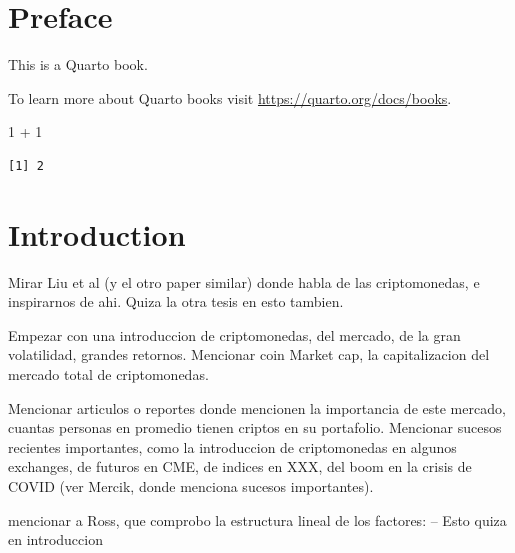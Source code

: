 \documentclass[
  11pt,
  a4paper,
  openany]{scrreprt}
\newenvironment{Shaded}{\begin{snugshade}}{\end{snugshade}}
\newcommand{\DecValTok}[1]{\textcolor[rgb]{0.68,0.00,0.00}{#1}}
\newcommand{\SpecialCharTok}[1]{\textcolor[rgb]{0.37,0.37,0.37}{#1}}
\renewcommand*\contentsname{Table of contents}
\newcommand\contentsname{Table of contents}
\begin{document}
\restoregeometry



\renewcommand*\contentsname{Table of contents}
{
\hypersetup{linkcolor=}
\setcounter{tocdepth}{1}
\tableofcontents
}
\listoffigures
\listoftables


\chapter*{Preface}\label{preface}


This is a Quarto book.

To learn more about Quarto books visit
\url{https://quarto.org/docs/books}.

\begin{Shaded}
\begin{Highlighting}[]
\DecValTok{1} \SpecialCharTok{+} \DecValTok{1}
\end{Highlighting}
\end{Shaded}

\begin{verbatim}
[1] 2
\end{verbatim}


\chapter{Introduction}\label{introduction}

Mirar Liu et al (y el otro paper similar) donde habla de las
criptomonedas, e inspirarnos de ahi. Quiza la otra tesis en esto
tambien.

Empezar con una introduccion de criptomonedas, del mercado, de la gran
volatilidad, grandes retornos. Mencionar coin Market cap, la
capitalizacion del mercado total de criptomonedas.

Mencionar articulos o reportes donde mencionen la importancia de este
mercado, cuantas personas en promedio tienen criptos en su portafolio.
Mencionar sucesos recientes importantes, como la introduccion de
criptomonedas en algunos exchanges, de futuros en CME, de indices en
XXX, del boom en la crisis de COVID (ver Mercik, donde menciona sucesos
importantes).

mencionar a Ross, que comprobo la estructura lineal de los factores: --
Esto quiza en introduccion
\end{document}
